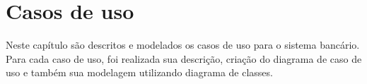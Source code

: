 \chapter{Casos de uso}

Neste capítulo são descritos e modelados os casos de uso para o sistema bancário. Para cada caso de uso, foi realizada sua descrição, criação do diagrama de caso de uso e também sua modelagem utilizando diagrama de classes.





